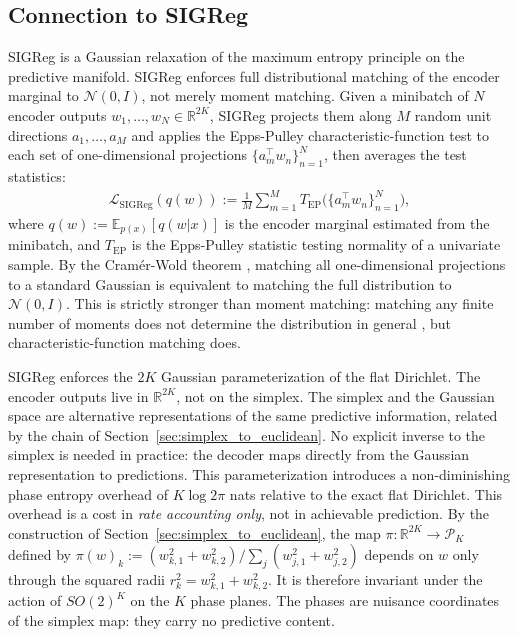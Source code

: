 \documentclass[11pt]{article}
\begin{document}
\subsection{Connection to SIGReg}
\label{sec:sig_connection}

SIGReg \cite{balestriero2025lejepa}
is a Gaussian relaxation of the maximum entropy principle on the
predictive manifold.
SIGReg enforces full distributional matching of the encoder marginal
to $\mathcal{N}(0,I)$, not merely moment matching.
Given a minibatch of $N$ encoder outputs
$w_1,\ldots,w_N\in\mathbb{R}^{2K}$, SIGReg projects them along $M$
random unit directions $a_1,\ldots,a_M$ and applies the Epps-Pulley
characteristic-function test \cite{epps1983test} to each set of
one-dimensional projections $\{a_m^\top w_n\}_{n=1}^N$, then
averages the test statistics:
\begin{align}
    \mathcal{L}_{\mathrm{SIGReg}}(q(w))
    := \frac{1}{M}\sum_{m=1}^{M}
    T_{\mathrm{EP}}\!\bigl(\{a_m^\top w_n\}_{n=1}^N\bigr),
    \label{eq:sigreg}
\end{align}
where $q(w) := \mathbb{E}_{p(x)}[q(w|x)]$ is the encoder marginal
estimated from the minibatch, and $T_{\mathrm{EP}}$ is the Epps-Pulley statistic testing
normality of a univariate sample.
By the Cram\'er-Wold theorem \cite{billingsley1995probability}, matching all one-dimensional projections
to a standard Gaussian is equivalent to matching the full distribution
to $\mathcal{N}(0,I)$.
This is strictly stronger than moment matching: matching any finite
number of moments does not determine the distribution in general
\cite{balestriero2025lejepa}, but characteristic-function matching does.

SIGReg enforces the $2K$ Gaussian parameterization of the flat Dirichlet.
The encoder outputs live in $\mathbb{R}^{2K}$, not on the simplex.
The simplex and the Gaussian space are alternative representations of
the same predictive information, related by the chain of
Section~\ref{sec:simplex_to_euclidean}.
No explicit inverse to the simplex is needed in practice: the decoder
maps directly from the Gaussian representation to predictions.
This parameterization introduces a non-diminishing phase entropy
overhead of $K\log 2\pi$ nats relative to the exact flat Dirichlet.
This overhead is a cost in \emph{rate accounting only}, not in
achievable prediction.
By the construction of Section~\ref{sec:simplex_to_euclidean}, the map
$\pi:\mathbb{R}^{2K}\to\mathcal{P}_K$ defined by
$\pi(w)_k := (w_{k,1}^2+w_{k,2}^2)/\sum_j(w_{j,1}^2+w_{j,2}^2)$
depends on $w$ only through the squared radii
$r_k^2=w_{k,1}^2+w_{k,2}^2$. It is therefore invariant under the
action of $SO(2)^K$ on the $K$ phase planes.
The phases are nuisance coordinates of the simplex map: they carry
no predictive content.
\end{document}
